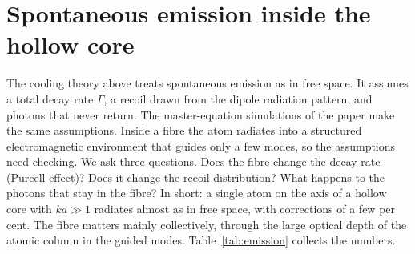\documentclass[11pt,a4paper]{article}
\begin{document}
\section{Spontaneous emission inside the hollow core}
\label{sec:emission}
The cooling theory above treats spontaneous emission as in free space. It assumes a total decay rate $\Gamma$, a recoil drawn from the dipole radiation pattern, and photons that never return. The master-equation simulations of the paper make the same assumptions. Inside a fibre the atom radiates into a structured electromagnetic environment that guides only a few modes, so the assumptions need checking. We ask three questions. Does the fibre change the decay rate (Purcell effect)? Does it change the recoil distribution? What happens to the photons that stay in the fibre? In short: a single atom on the axis of a hollow core with $ka\gg1$ radiates almost as in free space, with corrections of a few per cent. The fibre matters mainly collectively, through the large optical depth of the atomic column in the guided modes. Table~\ref{tab:emission} collects the numbers.
\end{document}
